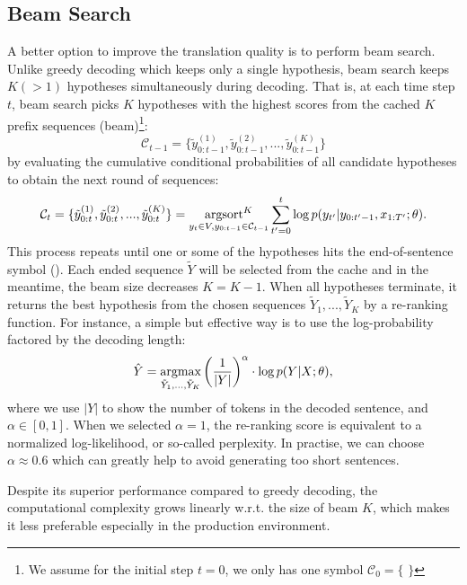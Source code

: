 \subsection{Beam Search}  
\label{cp2.sec.bs}
A better option to improve the translation quality is to perform beam search.
Unlike greedy decoding which keeps only a single hypothesis, beam search keeps $K (>1)$ hypotheses simultaneously during decoding. 
That is, at each time step $t$, beam search picks $K$ hypotheses with the highest scores from the cached $K$ prefix sequences (beam)\footnote{We assume for the initial step $t=0$, we only has one symbol $\mathcal{C}_0 = \{$ \bos $\}$}:
\begin{equation}
    \mathcal{C}_{t-1} = \{\tilde{y}_{0:t-1}^{(1)}, \tilde{y}_{0:t-1}^{(2)}, ..., \tilde{y}_{0:t-1}^{(K)} \}
\end{equation}
by evaluating the cumulative conditional probabilities of all candidate hypotheses to obtain the next round of sequences: 
\begin{equation}
     \mathcal{C}_{t} = \{\tilde{y}_{0:t}^{(1)}, \tilde{y}_{0:t}^{(2)}, ..., \tilde{y}_{0:t}^{(K)} \} =
     \mathop{\operatorname{\text{argsort}}^K}\limits_{y_t\in V, \\  y_{0:t-1}\in \mathcal{C}_{t-1}} \sum_{t'=0}^t\log p(y_{t'}|y_{0:t'-1}, x_{1:T'}; \theta).
\end{equation}
This process repeats until one or some of the hypotheses hits the end-of-sentence symbol (\eos). Each ended sequence $\tilde{Y}$ will be selected from the cache and in the meantime, the beam size decreases $K = K - 1$.
When all hypotheses terminate, it returns the best hypothesis from the chosen sequences $\tilde{Y}_1, ..., \tilde{Y}_K$ by a re-ranking function. For instance, a simple but effective way is to use the log-probability factored by the decoding length:
\begin{equation}
    \hat{Y} = \mathop{\text{argmax}}_{\tilde{Y}_1, ..., \tilde{Y}_K} \left(\frac{1}{|Y|}\right)^\alpha\cdot\log p(Y|X; \theta),
\end{equation}
where we use $|Y|$ to show the number of tokens in the decoded sentence, and $\alpha \in [0, 1]$. When we selected $\alpha=1$, the re-ranking score is equivalent to a normalized log-likelihood, or so-called perplexity. In practise, we can choose $\alpha \approx 0.6$ which can greatly help to avoid generating too short sentences.

Despite its superior performance compared to greedy decoding, the computational complexity grows linearly w.r.t. the size of beam $K$, which makes it less preferable especially in the production environment.

